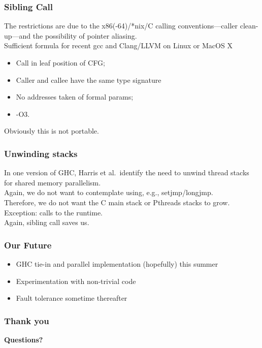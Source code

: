 \documentclass{beamer}
\begin{document}
\begin{frame}
\frametitle{Sibling Call}
The restrictions are due to the x86(-64)/*nix/C calling
conventions---caller clean-up---and the possibility of pointer aliasing.
\\\vspace{0.1in}
Sufficient formula for recent gcc and Clang/LLVM on Linux or MacOS X
\begin{itemize}
\item Call in leaf position of CFG;
\item Caller and callee have the same type signature
\item No addresses taken of formal params;
\item -O3.
\end{itemize}
Obviously this is not portable.
\end{frame}


\begin{frame}
\frametitle{Unwinding stacks}
In one version of GHC, Harris et al.\ identify the need to unwind thread stacks for shared
memory parallelism.
\\\vspace{0.1in}
Again, we do not want to contemplate using, e.g., setjmp/longjmp.
\\\vspace{0.1in}
Therefore, we do not want the C main stack or Pthreads stacks to grow.
\\\vspace{0.1in}
Exception:  calls to the runtime.
\\\vspace{0.1in}
Again, sibling call saves us.
\end{frame}


\begin{frame}
  \frametitle{Our Future}
  
  \begin{itemize}
  \item<1-> GHC tie-in and parallel implementation (hopefully) this summer
  \item<2-> Experimentation with non-trivial code
  \item<3-> Fault tolerance sometime thereafter
  \end{itemize}
  
  
\end{frame}


\begin{frame}
  \frametitle{Thank you}
  \textbf{Questions?}
\end{frame}
\end{document}
